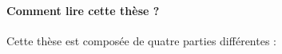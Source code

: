


 
\paragraph*{Comment lire cette th\`ese ?} Cette th\`ese est compos\'ee de quatre parties diff\'erentes :

